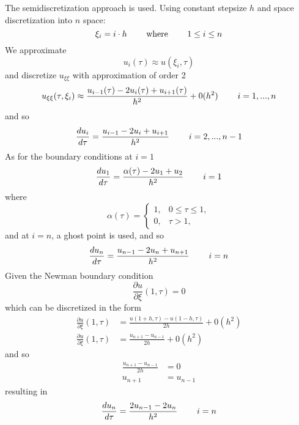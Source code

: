 \documentclass{article}
\begin{document}
The semidiscretization approach is used. Using constant stepsize $h$ and space discretization into $n$ space:
\begin{equation*}
    \xi_i = i \cdot h \hspace{0.8cm} \text{where}  \hspace{0.8cm} 1 \leq i \leq n 
\end{equation*}
We approximate
\begin{equation*}
    u_i(\tau) \approx u(\xi_i,\tau)
\end{equation*}
and discretize $u_{\xi \xi}$ with approximation of order 2
\begin{equation*}
    u_{\xi \xi}(\tau,\xi_i) \approx \frac{u_{i-1}(\tau) - 2u_i(\tau) + u_{i+1}(\tau)}{h^2} + 0(h^2) \hspace{0.8cm} i = 1, ..., n
\end{equation*}
and so
\begin{equation*}
    \frac{d u_i}{d\tau} = \frac{u_{i-1} - 2u_i + u_{i+1}}{h^2}  \hspace{0.8cm} i = 2, ..., n-1
\end{equation*}
As for the boundary conditions at $i = 1$
\begin{equation*}
    \frac{d u_1}{d\tau} = \frac{\alpha(\tau) - 2u_1 + u_{2}}{h^2}  \hspace{0.8cm} i = 1
\end{equation*}
where 
\begin{equation*} 
  \alpha(\tau)= 
\begin{cases}
    1,           & 0 \leq \tau \leq 1, \\
    0,              & \tau > 1,
\end{cases}
\end{equation*}
and at $i = n$, a ghost point is used, and so
\begin{equation*}
    \frac{d u_n}{d\tau} = \frac{u_{n-1} - 2u_n + u_{n+1}}{h^2}  \hspace{0.8cm} i = n
\end{equation*}
Given the Newman boundary condition
\begin{equation*}
    \frac{\partial u}{\partial \xi} (1,\tau) = 0
\end{equation*}
which can be discretized in the form
\begin{equation*}
\begin{split}
        \frac{\partial u}{\partial \xi} (1,\tau) &= \frac{u(1+h,\tau)-u(1-h,\tau)}{2h} + 0(h^2)\\
         \frac{\partial u}{\partial \xi} (1,\tau) &= \frac{u_{n+1}-u_{n-1}}{2h} + 0(h^2)
\end{split}
\end{equation*}
and so
\begin{equation*}
\begin{split}
    \frac{u_{n+1}-u_{n-1}}{2h} &= 0 \\
    u_{n+1} &= u_{n-1}
\end{split}
\end{equation*}
resulting in
\begin{equation*}
    \frac{d u_n}{d\tau} = \frac{2u_{n-1} - 2u_n}{h^2}  \hspace{0.8cm} i = n
\end{equation*}
\end{document}
